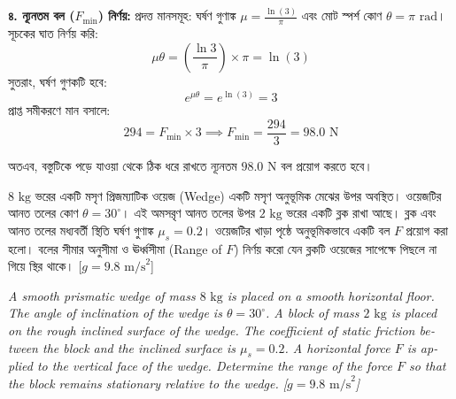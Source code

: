 \documentclass[12pt, a4paper]{article}
\begin{document}
\begin{tcolorbox}[solutionbox={সমাধান (Solution)}]
\vspace{0.5em}
\textbf{৪. ন্যূনতম বল ($F_{\min}$) নির্ণয়:}
প্রদত্ত মানসমূহ: ঘর্ষণ গুণাঙ্ক $\mu = \frac{\ln(3)}{\pi}$ এবং মোট স্পর্শ কোণ $\theta = \pi\text{ rad}$।
সূচকের ঘাত নির্ণয় করি:
$$\mu \theta = \left(\frac{\ln 3}{\pi}\right) \times \pi = \ln(3)$$
সুতরাং, ঘর্ষণ গুণকটি হবে:
$$e^{\mu \theta} = e^{\ln(3)} = 3$$
প্রাপ্ত সমীকরণে মান বসালে:
$$294 = F_{\min} \times 3 \implies F_{\min} = \frac{294}{3} = 98.0\text{ N}$$

অতএব, বস্তুটিকে পড়ে যাওয়া থেকে ঠিক ধরে রাখতে ন্যূনতম $98.0\text{ N}$ বল প্রয়োগ করতে হবে।
\end{tcolorbox}
\vspace{1em}

\begin{tcolorbox}[questionbox={প্রশ্ন (Question) 2}]
\noindent
$8\text{ kg}$ ভরের একটি মসৃণ প্রিজম্যাটিক ওয়েজ (Wedge) একটি মসৃণ অনুভূমিক মেঝের উপর অবস্থিত। ওয়েজটির আনত তলের কোণ $\theta = 30^\circ$। এই অমসরৃণ আনত তলের উপর $2\text{ kg}$ ভরের একটি ব্লক রাখা আছে। ব্লক এবং আনত তলের মধ্যবর্তী স্থিতি ঘর্ষণ গুণাঙ্ক $\mu_s = 0.2$। ওয়েজটির খাড়া পৃষ্ঠে অনুভূমিকভাবে একটি বল $F$ প্রয়োগ করা হলো। বলের সীমার অনুসীমা ও ঊর্ধ্বসীমা (Range of $F$) নির্ণয় করো যেন ব্লকটি ওয়েজের সাপেক্ষে পিছলে না গিয়ে স্থির থাকে। [$g = 9.8\text{ m/s}^2$]

\vspace{0.8em}
\begin{english}
\noindent\textit{\color{darkgray}
A smooth prismatic wedge of mass $8\text{ kg}$ is placed on a smooth horizontal floor. The angle of inclination of the wedge is $\theta = 30^\circ$. A block of mass $2\text{ kg}$ is placed on the rough inclined surface of the wedge. The coefficient of static friction between the block and the inclined surface is $\mu_s = 0.2$. A horizontal force $F$ is applied to the vertical face of the wedge. Determine the range of the force $F$ so that the block remains stationary relative to the wedge. [$g = 9.8\text{ m/s}^2$]
}
\end{english}
\end{tcolorbox}
\end{document}
